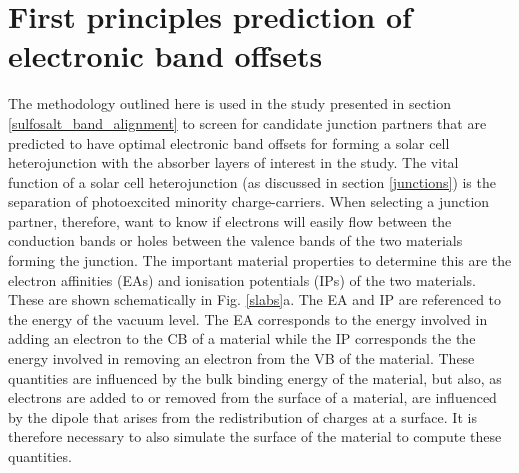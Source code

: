 \documentclass[11pt, twoside]{report}
\begin{document}
\section{First principles prediction of electronic band offsets}\label{band_alignment_methods}
The methodology outlined here is used in the study presented in section \ref{sulfosalt_band_alignment} to screen for candidate junction partners that are predicted to have optimal electronic band offsets for forming a solar cell heterojunction with the absorber layers of interest in the study. The vital function of a solar cell heterojunction (as discussed in section \ref{junctions}) is the separation of photoexcited minority charge-carriers. When selecting a junction partner, therefore, want to know if electrons will easily flow between the conduction bands or holes between the valence bands of the two materials forming the junction. The important material properties to determine this are the electron affinities (EAs) and ionisation potentials (IPs) of the two materials. These are shown schematically in Fig. \ref{slabs}a. The EA and IP are referenced to the energy of the vacuum level. The EA corresponds to the energy involved in adding an electron to the CB of a material while the IP corresponds the the energy involved in removing an electron from the VB of the material. These quantities are influenced by the bulk binding energy of the material, but also, as electrons are added to or removed from the surface of a material, are influenced by the dipole that arises from the redistribution of charges at a surface. It is therefore necessary to also simulate the surface of the material to compute these quantities.
\end{document}
